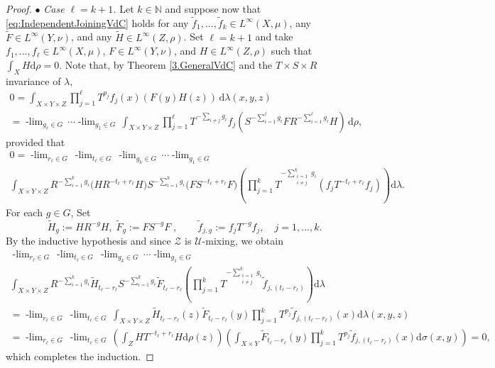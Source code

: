\documentclass[graybox]{svmult}
\theoremstyle{definition}
\newcommand{\N}{\mathbb{N}}
\newcommand{\plimgG}[3]{\mathop {#1\text{-lim}}_{#2\in #3}\,}
\begin{document}
\begin{proof}
$\bullet$ \textit{ Case $\ell=k+1$.} Let $k\in\N$ and suppose now that \eqref{eq:IndependentJoiningVdC} holds for any $\tilde f_1,...,\tilde f_k\in L^\infty(X,\mu)$, any $\tilde F\in L^\infty(Y,\nu)$, and any $\tilde H\in L^\infty(Z,\rho)$. 
Set $\ell=k+1$ and  take $f_1,...,f_\ell\in L^\infty(X,\mu)$, $F\in L^\infty(Y,\nu)$, and $H\in L^\infty(Z,\rho)$ such that $\int_X H\text{d}\rho=0$.
Note that, by Theorem \ref{3.GeneralVdC} and the $T\times S\times R$ invariance of $\lambda$, 
\begin{multline*}
0
=  \int_{X\times Y\times Z} \prod_{j=1}^\ell T^{p_j}f_j(x)(F(y)H(z))\,\text{d}\lambda(x,y,z)\\
= \plimgG{p_\ell}{g_\ell}{G}\cdots \plimgG{p_1}{g_1}{G} \int_{X\times Y\times Z}\prod_{j=1}^\ell T^{-\sum_{i\neq j}g_i}f_j(S^{-\sum_{i=1}^\ell g_i}FR^{-\sum_{i=1}^\ell g_i}H)\,\mathrm{d}\rho,
\end{multline*}
provided that
\begin{multline*}
0
= \plimgG{p_\ell}{r_\ell}{G}\plimgG{p_\ell}{t_\ell}{G} \plimgG{p_k}{g_k}{G}\cdots\plimgG{p_1}{g_1}{G} \\
\int_{X\times Y\times Z} R^{-\sum_{i=1}^k g_i}\Big(HR^{-t_\ell+r_\ell}H\Big)S^{-\sum_{i=1}^k g_i}\Big( FS^{-t_\ell+r_\ell}F\Big)
\left(\prod_{j=1}^kT^{-\sum_{\substack{i=1\\ i\neq j}}^k g_i}(f_jT^{-t_\ell+r_\ell}f_j)\right)\text{d}\lambda.
\end{multline*} 
For each $g\in G$, Set
\[
\tilde H_g:=HR^{-g}H,
\;\tilde F_g := F S^{-g}F\;,
\qquad
\tilde f_{j,g} := f_jT^{-g}f_j,\quad j=1,\dots,k.
\]
By the inductive hypothesis and since $\mathcal Z$ is $\mathcal U$-mixing, we obtain
\begin{multline*}
\plimgG{p_\ell}{r_\ell}{G}\plimgG{p_\ell}{t_\ell}{G}\plimgG{p_k}{g_k}{G}\cdots\plimgG{p_1}{g_1}{G}\\
\int_{X\times Y\times Z} R^{-\sum_{i=1}^k g_i}\tilde H_{t_\ell-r_\ell}S^{-\sum_{i=1}^kg_i}\tilde F_{t_\ell-r_\ell}\left(\prod_{j=1}^kT^{-\sum_{\substack{i=1\\ i\neq j}}^k g_i}\tilde f_{j,(t_\ell-r_\ell)}\right)\text{d}\lambda\\
= \plimgG{p_\ell}{r_\ell}{G}\plimgG{p_\ell}{t_\ell}{G}
\int_{X\times Y\times Z} \tilde H_{t_\ell-r_\ell}(z)\tilde F_{t_\ell-r_\ell}(y)\prod_{j=1}^kT^{p_j}\tilde f_{j,(t_\ell-r_\ell)}(x)\text{d}\lambda(x,y,z)\\
=\plimgG{p_\ell}{r_\ell}{G}\plimgG{p_\ell}{t_\ell}{G}
\left(\int_{Z} HT^{-t_\ell+r_\ell}H\text{d}\rho(z)\right)\left(\int_{X\times Y}\tilde F_{t_\ell-r_\ell}(y)\prod_{j=1}^kT^{p_j}\tilde f_{j,(t_\ell-r_\ell)}(x)\text{d}\sigma(x,y)\right)=0,
\end{multline*}
which completes the induction.
\end{proof}
\end{document}
